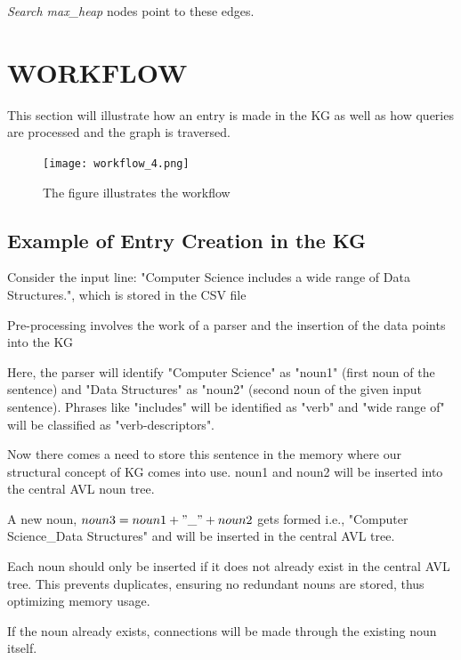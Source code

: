 \documentclass[conference]{IEEEtran}
\begin{document}
\textit{Search max\_heap} nodes point to these edges.


\section{WORKFLOW}


This section will illustrate how an entry is made in the KG as well as how queries are processed and the graph is traversed.

\begin{figure}[htbp]
\centerline{\texttt{[image: workflow\_4.png]}}
\caption{The figure illustrates the workflow}
\label{fig}
\end{figure}
\subsection{\textbf{Example of Entry Creation in the KG}}

Consider the input line: "Computer Science includes a wide range of Data Structures.", which is stored in the CSV file

Pre-processing involves the work of a parser and the insertion of the data points into the KG

Here, the parser will identify "Computer Science" as "noun1" (first noun of the sentence)
and "Data Structures" as "noun2" (second noun of the given input sentence).
Phrases like "includes" will be identified as "verb" and "wide range of" will be classified as "verb-descriptors".

Now there comes a need to store this sentence in the memory where our structural concept
of KG comes into use.
noun1 and noun2 will be inserted into the central AVL noun
tree.

A new noun, $noun3 = noun1 + "\_" + noun2$ gets formed i.e., "Computer Science\_Data Structures"
and will be inserted in the central AVL tree.

Each noun should only be inserted if it does not already exist in the central AVL tree. 
This prevents duplicates, ensuring no redundant nouns are stored, thus optimizing memory usage.

If the noun already exists, connections will be made through the existing noun itself.
\end{document}
